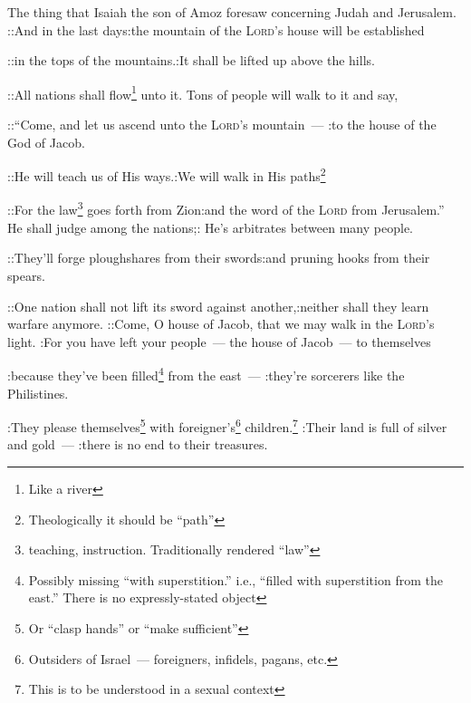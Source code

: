 


\begin{enumerate*}[mode=unboxed]
     The thing that Isaiah the son of Amoz foresaw concerning Judah and Jerusalem.%
     ::And in the last days:the mountain of the \textsc{Lord}'s house will be established%
    
    ::in the tops of the mountains.:It shall be lifted up above the hills.%
    
    ::All nations shall flow\footnote{Like a river} unto it. Tons of people will walk to it and say,%
    
    ::``Come, and let us ascend unto the \textsc{Lord}'s mountain~--- :to the house of the God of Jacob.%
    
    ::He will teach us of His ways.:We will walk in His paths\footnote{Theologically it should be ``path''}%
    
    ::For the law\footnote{teaching, instruction. Traditionally rendered ``law''} goes forth from Zion:and the word of the \textsc{Lord} from Jerusalem.''%
     He shall judge among the nations;: He's arbitrates between many people.%
    
    ::They'll forge ploughshares from their swords:and pruning hooks from their spears.%
    
    ::One nation shall not lift its sword against another,:neither shall they learn warfare anymore.%
     ::Come, O house of Jacob, that we may walk in the \textsc{Lord}'s light.%
     :For you have left your people~--- the house of Jacob~--- to themselves%
    
    :because they've been filled\footnote{Possibly missing ``with superstition.'' i.e., ``filled with superstition from the east.'' There is no expressly-stated object} from the east~--- :they're sorcerers like the Philistines.%
    
    :They please themselves\footnote{Or ``clasp hands'' or ``make sufficient''} with foreigner's\footnote{Outsiders of Israel~--- foreigners, infidels, pagans, etc.} children.\footnote{This is to be understood in a sexual context}%
     :Their land is full of silver and gold~--- :there is no end to their treasures.%
    

\end{enumerate*}
